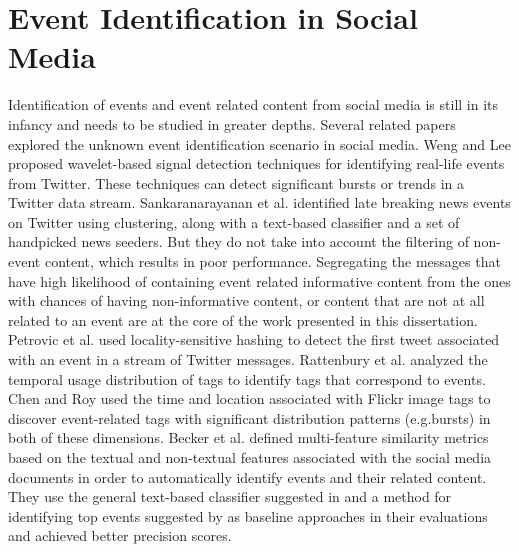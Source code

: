 \section{Event Identification in Social Media}
Identification of events and event related content from social media is still in its infancy and needs to be studied in greater depths. Several related papers explored the unknown event identification scenario in social media.
Weng and Lee \cite{weng2011event} proposed wavelet-based signal detection techniques for identifying
real-life events from Twitter. These techniques can detect significant bursts or trends
in a Twitter data stream. Sankaranarayanan et al. \cite{sankaranarayanan2009twitterstand}
identified late breaking news events on Twitter using clustering, along with a text-based
classifier and a set of handpicked news seeders. But they do not take into account the filtering of non-event content, which results in poor performance. Segregating the messages that have high likelihood of containing event related informative content from the ones with chances of having non-informative content, or content that are not at all related to an event are at the core of the work presented in this dissertation.  Petrovic et al. \cite{petrovic2010streaming} used locality-sensitive hashing to detect the first tweet associated with an event in a stream of Twitter messages. Rattenbury et al. \cite{rattenbury2007towards} analyzed the temporal usage distribution of tags to identify tags that correspond to events. Chen and Roy \cite{chen2009event} used the time and location associated with Flickr image
tags to discover event-related tags with significant distribution patterns (e.g.bursts) in both of these dimensions. Becker et al. \cite{becker2010learning} defined multi-feature similarity metrics based on the textual and non-textual features associated with the social media documents in order to automatically identify events and their related content.
They use the general text-based classifier suggested in \cite{sankaranarayanan2009twitterstand} and a method for identifying top events suggested by \cite{petrovic2010streaming} as baseline approaches in their evaluations and achieved better precision scores.








